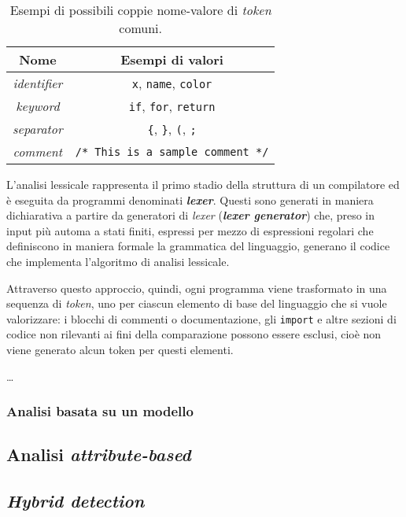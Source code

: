 \begin{table}[h]
    \centering
    \begin{tabular}{|c|c|} 
        \hline
        \textbf{Nome} & \textbf{Esempi di valori} \\ [0.5ex] 
        \hline\hline
        \textit{identifier} & \texttt{x}, \texttt{name}, \texttt{color} \\ 
        \hline
        \textit{keyword} & \texttt{if}, \texttt{for}, \texttt{return} \\
        \hline
        \textit{separator} & \texttt{\{}, \texttt{\}}, \texttt{(}, \texttt{;} \\
        \hline
        \textit{comment} & \texttt{/* This is a sample comment */} \\
        \hline
    \end{tabular}
    \caption{Esempi di possibili coppie nome-valore di \textit{token} comuni.}
    \label{table:token-examples}
\end{table}

L'analisi lessicale rappresenta il primo stadio della struttura di un compilatore ed è eseguita da programmi denominati \textbf{\textit{lexer}}. 
%
Questi sono generati in maniera dichiarativa a partire da generatori di \textit{lexer} (\textbf{\textit{lexer generator}}) che, preso in input più automa a stati finiti, espressi per mezzo di espressioni regolari che definiscono in maniera formale la grammatica del linguaggio, generano il codice che implementa l'algoritmo di analisi lessicale. 

Attraverso questo approccio, quindi, ogni programma viene trasformato in una sequenza di \textit{token}, uno per ciascun elemento di base del linguaggio che si vuole valorizzare: i blocchi di commenti o documentazione, gli \texttt{import} e altre sezioni di codice non rilevanti ai fini della comparazione possono essere esclusi, cioè non viene generato alcun token per questi elementi.

\dots

\subsubsection{Analisi basata su un modello}

\subsection{Analisi \textit{attribute-based}}

\subsection{\textit{Hybrid detection}}

